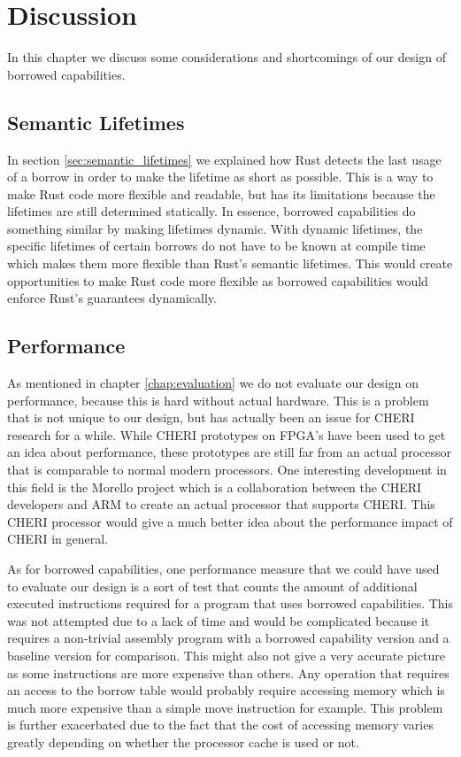 \chapter{Discussion}
\label{chap:discussion}
In this chapter we discuss some considerations and shortcomings of our design of borrowed capabilities.

\section{Semantic Lifetimes}
In section \ref{sec:semantic_lifetimes} we explained how Rust detects the last usage of a borrow in order to make the lifetime as short as possible.
This is a way to make Rust code more flexible and readable, but has its limitations because the lifetimes are still determined statically.
In essence, borrowed capabilities do something similar by making lifetimes dynamic.
With dynamic lifetimes, the specific lifetimes of certain borrows do not have to be known at compile time which makes them more flexible than Rust's semantic lifetimes.
This would create opportunities to make Rust code more flexible as borrowed capabilities would enforce Rust's guarantees dynamically.

\section{Performance}
As mentioned in chapter \ref{chap:evaluation} we do not evaluate our design on performance, because this is hard without actual hardware.
This is a problem that is not unique to our design, but has actually been an issue for CHERI research for a while.
While CHERI prototypes on FPGA's have been used to get an idea about performance, these prototypes are still far from an actual processor that is comparable to normal modern processors.
One interesting development in this field is the Morello project \cite{morello} which is a collaboration between the CHERI developers and ARM to create an actual processor that supports CHERI.
This CHERI processor would give a much better idea about the performance impact of CHERI in general.

As for borrowed capabilities, one performance measure that we could have used to evaluate our design is a sort of test that counts the amount of additional executed instructions required for a program that uses borrowed capabilities.
This was not attempted due to a lack of time and would be complicated because it requires a non-trivial assembly program with a borrowed capability version and a baseline version for comparison.
This might also not give a very accurate picture as some instructions are more expensive than others.
Any operation that requires an access to the borrow table would probably require accessing memory which is much more expensive than a simple move instruction for example.
This problem is further exacerbated due to the fact that the cost of accessing memory varies greatly depending on whether the processor cache is used or not.

